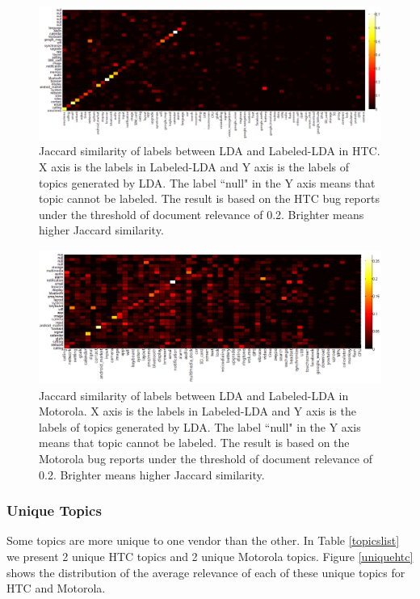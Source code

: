 \documentclass[10pt, conference, compsocconf]{IEEEtran}
\begin{document}
\begin{figure}
\centering
\includegraphics[width=1\textwidth]{htcsim.png}
\caption{Jaccard similarity of labels between LDA and Labeled-LDA in HTC. X axis is the labels in Labeled-LDA and Y axis is the labels of topics generated by LDA. The label ``null" in the Y axis means that topic cannot be labeled. The result is based on the HTC bug reports under the threshold of document relevance of 0.2. Brighter means higher Jaccard similarity.}
\label{similarityhtc}
\end{figure}

\begin{figure}
\centering
\includegraphics[width=1\textwidth]{motosim.png}
\caption{Jaccard similarity of labels between LDA and Labeled-LDA in Motorola. X axis is the labels in Labeled-LDA and Y axis is the labels of topics generated by LDA. The label ``null" in the Y axis means that topic cannot be labeled. The result is based on the Motorola bug reports under the threshold of document relevance of 0.2. Brighter means higher Jaccard similarity.}
\label{similaritymoto}
\end{figure}


\subsubsection{Unique Topics}

Some topics are more unique to one vendor than the other.
In Table \ref{topicslist} we present 2 unique HTC topics and 2 unique
Motorola topics. Figure \ref{uniquehtc} shows the distribution of the
average relevance of each of these unique topics for HTC and Motorola.
\end{document}
